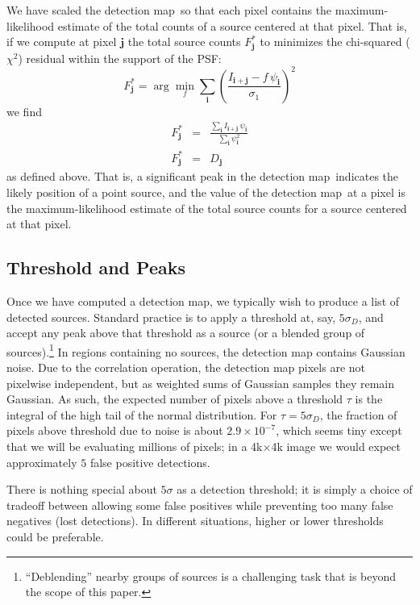 \documentclass[letterpaper,preprint]{aastex62}
\newcommand{\detmap}{detection map}
\newcommand{\psf}{\psi}
\newcommand{\psfat}[1]{\psf_{#1}}
\renewcommand{\vec}[1]{\boldsymbol{#1}}
\newcommand{\ivec}{\vec{i}}
\newcommand{\jvec}{\vec{j}}
\begin{document}
We have scaled the \detmap\ so that each pixel contains the
maximum-likelihood estimate of the total counts of a source centered
at that pixel.  That is, if we compute at pixel $\jvec$ the total
source counts $F^{\ast}_{\jvec}$ to minimizes the chi-squared
($\chi^2$) residual within the support of the PSF:
\begin{equation}
  F^{\ast}_{\jvec} = \arg\min_{f} \sum_{\ivec} \left( \frac{I_{\ivec+\jvec} - f \, \psfat{\ivec}}{\sigma_1} \right)^2
\end{equation}
we find
\begin{eqnarray}
  F^{\ast}_{\jvec} &=& \frac{\sum_{\ivec} I_{\ivec+\jvec} \, \psfat{\ivec}}{\sum_{\ivec} \psfat{\ivec}^2}
  \\
  F^{\ast}_{\jvec} &=& D_{\jvec} %
\end{eqnarray}
as defined above.
%
That is, a significant peak in the \detmap\ indicates the likely
position of a point source, and the value of the \detmap\ at a pixel
is the maximum-likelihood estimate of the total source counts for a
source centered at that pixel.


\subsection{Threshold and Peaks}


Once we have computed a detection map, we typically wish to produce a
list of detected sources.  Standard practice is to apply a threshold
at, say, $5 \sigma_D$, and accept any peak above that threshold as a
source (or a blended group of sources).\footnote{%
  ``Deblending'' nearby groups of sources is a challenging task that
  is beyond the scope of this paper.}
In regions containing no
sources, the detection map contains Gaussian noise.  Due to the
correlation operation, the detection map pixels are not pixelwise
independent, but as weighted sums of Gaussian samples they remain
Gaussian.  As such, the expected number of pixels above a threshold
$\tau$ is the integral of the high tail of the normal distribution.
For $\tau = 5 \sigma_D$, the fraction of pixels above threshold due to
noise is about $2.9\times10^{-7}$, which seems tiny except that we
will be evaluating millions of pixels; in a 4k$\times$4k image we
would expect approximately $5$ false positive detections.

There is nothing special about $5 \sigma$ as a detection threshold; it
is simply a choice of tradeoff between allowing some false positives
while preventing too many false negatives (lost detections).  In
different situations, higher or lower thresholds could be preferable.
\end{document}
